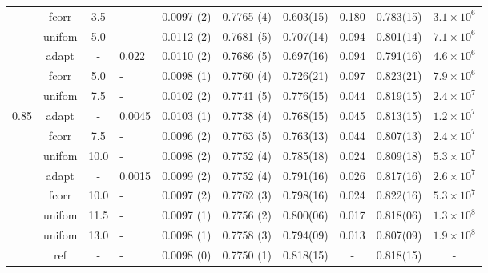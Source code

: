 \documentclass[aps,pre,preprint]{revtex4}
\begin{document}
\begin{table}
\begin{tabular*}{0.99\textwidth}{c|c|@{\extracolsep{\fill}}clcccccc}
    & \textrm{fcorr}  & 3.5     & -       & 0.0097 (2) & 0.7765 (4) & 0.603(15) & 0.180 & 0.783(15) & $3.1\times 10^6$\\\cline{2-10}
    & \textrm{unifom} & 5.0     & -       & 0.0112 (2) & 0.7681 (5) & 0.707(14) & 0.094 & 0.801(14) & $7.1\times 10^6$\\
    & \textrm{adapt}  & -       & 0.022   & 0.0110 (2) & 0.7686 (5) & 0.697(16) & 0.094 & 0.791(16) & $4.6\times 10^6$\\
    & \textrm{fcorr}  & 5.0     & -       & 0.0098 (1) & 0.7760 (4) & 0.726(21) & 0.097 & 0.823(21) & $7.9\times 10^6$\\\cline{2-10}
    & \textrm{unifom} & 7.5     & -       & 0.0102 (2) & 0.7741 (5) & 0.776(15) & 0.044 & 0.819(15) & $2.4\times 10^7$\\
0.85& \textrm{adapt}  & -       & 0.0045  & 0.0103 (1) & 0.7738 (4) & 0.768(15) & 0.045 & 0.813(15) & $1.2\times 10^7$\\
    & \textrm{fcorr}  & 7.5     & -       & 0.0096 (2) & 0.7763 (5) & 0.763(13) & 0.044 & 0.807(13) & $2.4\times 10^7$\\\cline{2-10}
    & \textrm{unifom} & 10.0    & -       & 0.0098 (2) & 0.7752 (4) & 0.785(18) & 0.024 & 0.809(18) & $5.3\times 10^7$\\
    & \textrm{adapt}  & -       & 0.0015  & 0.0099 (2) & 0.7752 (4) & 0.791(16) & 0.026 & 0.817(16) & $2.6\times 10^7$\\
    & \textrm{fcorr}  & 10.0    & -       & 0.0097 (2) & 0.7762 (3) & 0.798(16) & 0.024 & 0.822(16) & $5.3\times 10^7$\\\cline{2-10}
    & \textrm{unifom} & 11.5    & -       & 0.0097 (1) & 0.7756 (2) & 0.800(06) & 0.017 & 0.818(06) & $1.3\times 10^8$\\
    & \textrm{unifom} & 13.0    & -       & 0.0098 (1) & 0.7758 (3) & 0.794(09) & 0.013 & 0.807(09) & $1.9\times 10^8$\\\cline{2-10}
    & \textrm{ref}    & -       & -       & 0.0098 (0) & 0.7750 (1) & 0.818(15) & -     & 0.818(15) & - \\    \hline\hline
  \end{tabular*}
\end{table}
\end{document}
